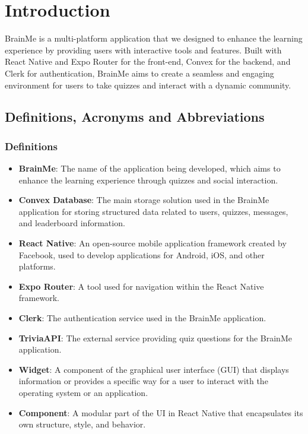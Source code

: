 \vspace{0.7cm}

\section{Introduction}

BrainMe is a multi-platform application that we designed to enhance the learning experience by providing users with interactive tools and features. Built with React Native and Expo Router for the front-end, Convex for the backend, and Clerk for authentication, BrainMe aims to create a seamless and engaging environment for users to take quizzes and interact with a dynamic community.

\subsection{Definitions, Acronyms and Abbreviations}

\subsubsection{Definitions}

\begin{itemize}
    \item \textbf{BrainMe}: The name of the application being developed, which aims to enhance the learning experience through quizzes and social interaction.
    \item \textbf{Convex Database}: The main storage solution used in the BrainMe application for storing structured data related to users, quizzes, messages, and leaderboard information.
    \item \textbf{React Native}: An open-source mobile application framework created by Facebook, used to develop applications for Android, iOS, and other platforms.
    \item \textbf{Expo Router}: A tool used for navigation within the React Native framework.
    \item \textbf{Clerk}: The authentication service used in the BrainMe application.
    \item \textbf{TriviaAPI}: The external service providing quiz questions for the BrainMe application.
    \item \textbf{Widget}: A component of the graphical user interface (GUI) that displays information or provides a specific way for a user to interact with the operating system or an application.
    \item \textbf{Component}: A modular part of the UI in React Native that encapsulates its own structure, style, and behavior.
\end{itemize}

